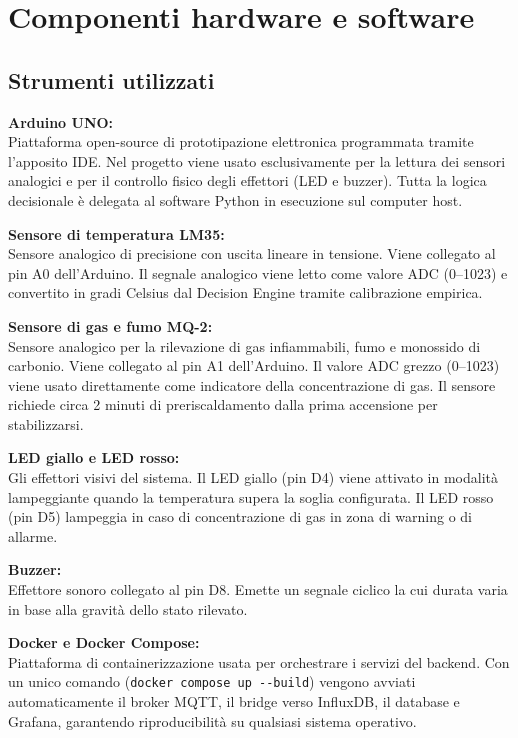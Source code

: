 \documentclass{article}
\begin{document}
\section{Componenti hardware e software}

\subsection{Strumenti utilizzati}

\textbf{Arduino UNO:}\\
Piattaforma open-source di prototipazione elettronica programmata tramite
l'apposito IDE. Nel progetto viene usato esclusivamente per la lettura dei
sensori analogici e per il controllo fisico degli effettori (LED e buzzer).
Tutta la logica decisionale è delegata al software Python in esecuzione sul
computer host.

\textbf{Sensore di temperatura LM35:}\\
Sensore analogico di precisione con uscita lineare in tensione. Viene collegato
al pin A0 dell'Arduino. Il segnale analogico viene letto come valore ADC
(0--1023) e convertito in gradi Celsius dal Decision Engine tramite calibrazione
empirica.

\textbf{Sensore di gas e fumo MQ-2:}\\
Sensore analogico per la rilevazione di gas infiammabili, fumo e monossido di
carbonio. Viene collegato al pin A1 dell'Arduino. Il valore ADC grezzo (0--1023)
viene usato direttamente come indicatore della concentrazione di gas. Il sensore
richiede circa 2 minuti di preriscaldamento dalla prima accensione per
stabilizzarsi.

\textbf{LED giallo e LED rosso:}\\
Gli effettori visivi del sistema. Il LED giallo (pin D4) viene attivato in
modalità lampeggiante quando la temperatura supera la soglia configurata. Il LED
rosso (pin D5) lampeggia in caso di concentrazione di gas in zona di warning o
di allarme.

\textbf{Buzzer:}\\
Effettore sonoro collegato al pin D8. Emette un segnale ciclico la cui durata
varia in base alla gravità dello stato rilevato.

\textbf{Docker e Docker Compose:}\\
Piattaforma di containerizzazione usata per orchestrare i servizi del backend.
Con un unico comando (\texttt{docker compose up -{}-build}) vengono avviati
automaticamente il broker MQTT, il bridge verso InfluxDB, il database e Grafana,
garantendo riproducibilità su qualsiasi sistema operativo.
\end{document}
